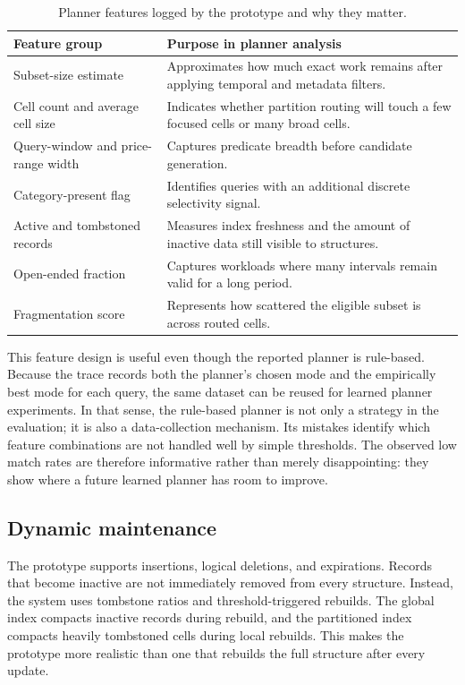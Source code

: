 \documentclass[sigconf,nonacm]{acmart}
\begin{document}
\begin{table}[t]
\caption{Planner features logged by the prototype and why they matter.}
\label{tab:plannerfeatures}
\centering
\small
\begin{tabular}{p{2.6cm}p{4.5cm}}
\toprule
Feature group & Purpose in planner analysis \\
\midrule
Subset-size estimate & Approximates how much exact work remains after applying temporal and metadata filters. \\
Cell count and average cell size & Indicates whether partition routing will touch a few focused cells or many broad cells. \\
Query-window and price-range width & Captures predicate breadth before candidate generation. \\
Category-present flag & Identifies queries with an additional discrete selectivity signal. \\
Active and tombstoned records & Measures index freshness and the amount of inactive data still visible to structures. \\
Open-ended fraction & Captures workloads where many intervals remain valid for a long period. \\
Fragmentation score & Represents how scattered the eligible subset is across routed cells. \\
\bottomrule
\end{tabular}
\end{table}

This feature design is useful even though the reported planner is rule-based. Because the trace records both the planner's chosen mode and the empirically best mode for each query, the same dataset can be reused for learned planner experiments. In that sense, the rule-based planner is not only a strategy in the evaluation; it is also a data-collection mechanism. Its mistakes identify which feature combinations are not handled well by simple thresholds. The observed low match rates are therefore informative rather than merely disappointing: they show where a future learned planner has room to improve.

\subsection{Dynamic maintenance}

The prototype supports insertions, logical deletions, and expirations. Records that become inactive are not immediately removed from every structure. Instead, the system uses tombstone ratios and threshold-triggered rebuilds. The global index compacts inactive records during rebuild, and the partitioned index compacts heavily tombstoned cells during local rebuilds. This makes the prototype more realistic than one that rebuilds the full structure after every update.
\end{document}
